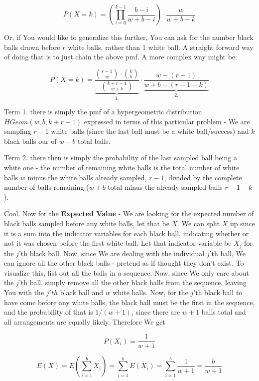 \documentclass{article}
\begin{document}
		$$P(X = k) = \left( \prod^{k-1}_{i=0} \frac{b - i}{w+b-i} \right) \cdot \frac{w}{w+b-k} $$
		 
		Or, if You would like to generalize this further, You can ask for the number black balls drawn before $r$ white balls, rather than 1 white ball. A straight forward way of doing that is to just chain the above pmf. A more complex way might be:
		
		$$P(X = k) = \underbrace{\frac{{r - 1 \choose w} \cdot {k \choose b}}{{k + r - 1 \choose w+b}} } _{1.}\cdot \underbrace{\frac{w - (r - 1)}{w + b - (r - 1 - k)}}_{2.}$$ 
		
		Term 1. there is simply the pmf of a hypergeometric distribution \newline $HGeom(w, b, k+r-1)$ expressed in terms of this particular problem - We are sampling $r-1$ white balls (since the last ball must be a white ball/success) and $k$ black balls our of $w+b$ total balls.
		
		Term 2. there then is simply the probability of the last sampled ball being a white one - the number of remaining white balls is the total number of white balls $w$ minus the white balls already sampled, $r-1$, divided by the complete number of balls remaining ($w+b$ total minus the already sampled balls $r - 1 - k$).
		
		Cool. Now for the \textbf{Expected Value} - We are looking for the expected number of black balls sampled before any white balls, let that be $X$. We can split $X$ up since it is a sum into the indicator variables for each black ball, indicating whether or not it was chosen before the first white ball. Let that indicator variable be $X_j$ for the $j$'th black ball. Now, since We are dealing with the individual $j$'th ball, We can ignore all the other black balls - pretend as if thought they don't exist. To visualize this, list out all the balls in a sequence. Now, since We only care about the $j$'th ball, simply remove all the other black balls from the sequence, leaving You with the $j'th$ black ball and $w$ white  balls. Now, for the $j$'th black ball to have come before any white balls, the black ball must be the first in the sequence, and the probability of that is $1/(w+1)$, since there are $w+1$ balls total and all arrangements are equally likely. Therefore We get
		
		$$P(X_i) = \frac{1}{w+1}$$
		
		$$E(X) = E\left(\sum^b_{i=1} X_i\right) = \sum^b_{i=1} E(X_i) = \sum^b_{i=1} \frac{1}{w+1} = \frac{b}{w+1}$$
		
\end{document}
